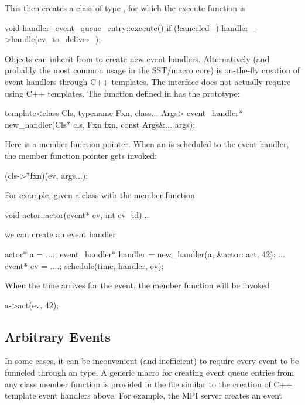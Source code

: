 This then creates a class of type , for which the execute function is

\begin{CppCode}
void
handler_event_queue_entry::execute()
{
  if (!canceled_) {
    handler_->handle(ev_to_deliver_);
  }
}
\end{CppCode}

Objects can inherit from  to create new event handlers.
Alternatively (and probably the most common usage in the SST/macro core) is on-the-fly creation of event handlers through C++ templates.
The interface does not actually require using C++ templates.
The function  defined in  has the prototype:

\begin{CppCode}
template<class Cls, typename Fxn, class... Args>
event_handler*
new_handler(Cls* cls, Fxn fxn, const Args&... args);
\end{CppCode}

Here  is a member function pointer.
When an  is scheduled to the event handler, the member function pointer gets invoked:

\begin{CppCode}
(cls->*fxn)(ev, args...);
\end{CppCode}

For example, given a class  with the member function 

\begin{CppCode}
void
actor::actor(event* ev, int ev_id){...}
\end{CppCode}
we can create an event handler

\begin{CppCode}
actor* a = ....;
event_handler* handler = new_handler(a, &actor::act, 42);
...
event* ev = ....;
schedule(time, handler, ev);
\end{CppCode}
When the time arrives for the event, the member function will be invoked

\begin{CppCode}
a->act(ev, 42);
\end{CppCode}

\subsection{Arbitrary Events}
In some cases, it can be inconvenient (and inefficient) to require every event to be funneled through an \evhandler type.
A generic macro for creating event queue entries from any class member function is provided in the file  similar to the creation of C++ template event handlers above.
For example, the MPI server creates an event

